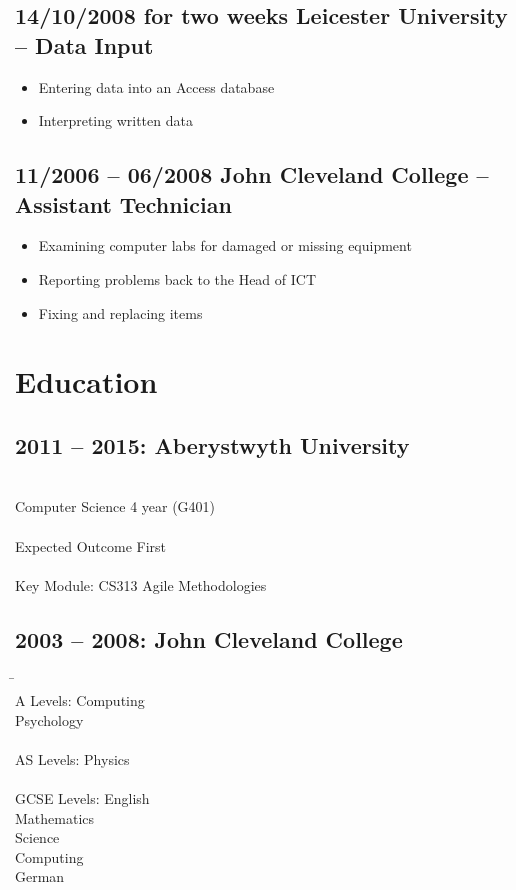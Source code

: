 \documentclass[0pt]{article}
\begin{document}
\subsection*{14/10/2008 for two weeks     Leicester University --  Data Input}
\begin{itemize}
	\item Entering data into an Access database
	\item Interpreting written data
\end{itemize}

\subsection*{11/2006 -- 06/2008      John Cleveland College -- Assistant Technician}
\begin{itemize}
	\item Examining computer labs for damaged or missing equipment
	\item Reporting problems back to the Head of ICT
	\item Fixing and replacing items
\end{itemize}

\section*{Education}
\subsection*{2011 -- 2015: Aberystwyth University}
\begin{tabbing}
~~~~~~~~~~~~~~~~~~~~~~~~\=\\
\> Computer Science 4 year (G401)\\
\\
\> Expected Outcome First\\
\\
\> Key Module: CS313 Agile Methodologies   
\end{tabbing}

\subsection*{2003 -- 2008: John Cleveland College}  
\begin{tabbing}
\=~~~~~~~~~~~~~~~~~~~~~~~~\=\\
\> A Levels:  \>Computing \\

\>\>Psychology\\
\\
\> AS Levels: \>Physics \\
\\
\> GCSE Levels: \>English\\

\>\>Mathematics\\

\>\>Science\\

\>\>Computing\\

\>\>German\\
\end{tabbing}
\end{document}
